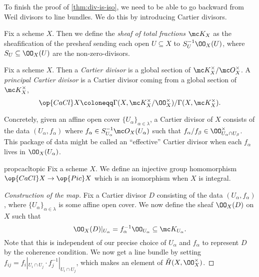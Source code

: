 \documentclass[../notes.tex]{subfiles}
\begin{document}
To finish the proof of \autoref{thm:div-is-iso}, we need to be able to go backward from Weil divisors to line bundles. We do this by introducing Cartier divisors.
\begin{definition}
	Fix a scheme $X$. Then we define the \textit{sheaf of total fractions} $\mc K_X$ as the sheafification of the presheaf sending each open $U\subseteq X$ to $S_U^{-1}\OO_X(U)$, where $S_U\subseteq\OO_X(U)$ are the non-zero-divisors.
\end{definition}
\begin{definition}
	Fix a scheme $X$. Then a \textit{Cartier divisor} is a global section of $\mc K_X^\times/\mc O_X^\times$. A \textit{principal Cartier divisor} is a Cartier divisor coming from a global section of $\mc K_X^\times$,
	\[\op{CaCl}X\coloneqq\Gamma(X,\mc K_X^\times/\OO_X^\times)/\Gamma(X,\mc K_X^\times).\]
\end{definition}
\begin{remark}
	Concretely, given an affine open cover $\{U_\alpha\}_{\alpha\in\lambda}$, a Cartier divisor of $X$ consists of the data $(U_\alpha,f_\alpha)$ where $f_\alpha\in S_{U_\alpha}^{-1}\mc O_X(U_\alpha)$ such that $f_\alpha/f_\beta\in\OO_{U_\alpha\cap U_\beta}^\times$. This package of data might be called an ``effective'' Cartier divisor when each $f_\alpha$ lives in $\OO_X(U_\alpha)$.
\end{remark}
\begin{restatable}{prop}{cacltopic}
	Fix a scheme $X$. We define an injective group homomorphism $\op{CaCl}X\to\op{Pic}X$ which is an isomorphism when $X$ is integral.
\end{restatable}
\begin{proof}[Construction of the map]
	Fix a Cartier divisor $D$ consisting of the data $(U_\alpha,f_\alpha)$, where $\{U_\alpha\}_{\alpha\in\lambda}$ is some affine open cover. We now define the sheaf $\OO_X(D)$ on $X$ such that
	\[\OO_X(D)|_{U_\alpha}=f_\alpha^{-1}\OO_{U_\alpha}\subseteq\mc K_{U_\alpha}.\]
	Note that this is independent of our precise choice of $U_\alpha$ and $f_\alpha$ to represent $D$ by the coherence condition. We now get a line bundle by setting $f_{ij}=f_i|_{U_i\cap U_j}\cdot f_j^{-1}|_{U_i\cap U_j}$, which makes an element of $\check H(X,\OO_X^\times)$.
\end{proof}
\end{document}
